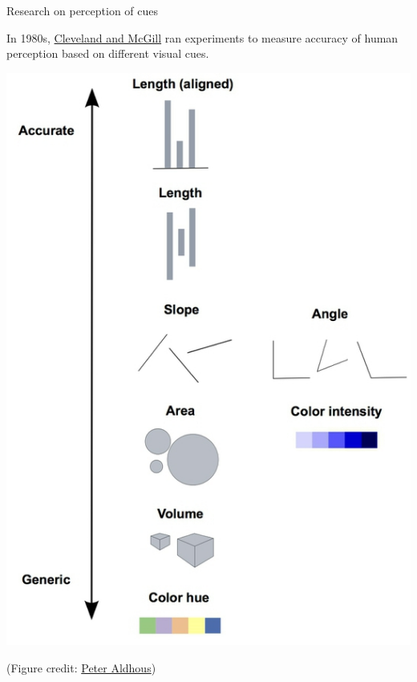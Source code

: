 \documentclass[table]{beamer}\usepackage[]{graphicx}\usepackage[]{color}
\begin{document}


\begin{frame}[fragile]{Research on perception of cues}

\begin{block}{In 1980s, \href{https://courses.ischool.berkeley.edu/i247/f05/readings/Cleveland_GraphicalPerception_Science85.pdf}{Cleveland and McGill} ran experiments to measure accuracy of human perception based on different visual cues.}

\includegraphics[width=.45\textwidth]{figure-static/perception.jpeg}

\tiny (Figure credit: \href{https://paldhous.github.io/ucb/2016/dataviz/week2.html}{Peter Aldhous})
\end{block}

\vspace{15em}

\end{frame}

%
%
\end{document}
